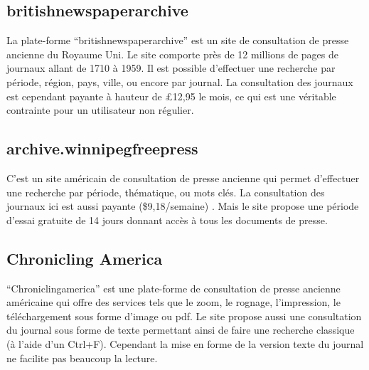         \subsection{britishnewspaperarchive}
        \label{subsec:britishnewspaper}
        La plate-forme “britishnewspaperarchive” est un site de consultation de presse ancienne du Royaume Uni.
        Le site comporte près de 12 millions de pages de journaux allant de 1710 à 1959. Il est possible
        d’effectuer une recherche par période, région, pays, ville, ou encore par journal. La consultation
        des journaux est cependant payante à hauteur de £12,95 le mois, ce qui est une véritable contrainte
        pour un utilisateur non régulier.

        \subsection{archive.winnipegfreepress}
        \label{subsec:winnipeg}
        C’est un site américain de consultation de presse ancienne qui permet d’effectuer une recherche par période,
        thématique, ou mots clés. La consultation des journaux ici  est aussi payante
        (\$9,18/semaine) . Mais le site propose une période d’essai gratuite de 14 jours donnant accès à tous les documents de presse.

        \subsection{Chronicling America}
        \label{subsec:chrinamerica}
        “Chroniclingamerica” est une plate-forme de consultation de presse ancienne américaine qui offre des services
        tels que le zoom, le rognage, l’impression, le téléchargement sous forme d’image ou pdf. Le site propose
        aussi une consultation du journal sous forme de texte permettant ainsi de faire une recherche classique
        (à l’aide d’un Ctrl+F). Cependant la mise en forme de la version texte du journal ne facilite pas beaucoup la lecture.

